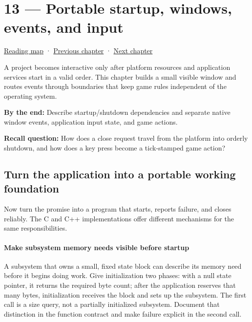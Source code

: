 \hypertarget{05-engine-i-ch013}{}
\chapter{13 --- Portable startup, windows, events, and input}\label{05-engine-i-ch013-portable-startup-windows-events-and-input}

\hyperref[volume-reading-map]{Reading map} · \hyperref[05-engine-i-ch012]{Previous chapter} · \hyperref[05-engine-i-ch014]{Next chapter}

A project becomes interactive only after platform resources and application services start in a valid order. This chapter builds a small visible window and routes events through boundaries that keep game rules independent of the operating system.

\textbf{By the end:} Describe startup/shutdown dependencies and separate native window events, application input state, and game actions.

\textbf{Recall question:} How does a close request travel from the platform into orderly shutdown, and how does a key press become a tick-stamped game action?

\section{Turn the application into a portable working foundation}\label{05-engine-i-ch013-turn-the-application-into-a-portable-working-foundation}

Now turn the promise into a program that starts, reports failure, and closes reliably. The C and C++ implementations offer different mechanisms for the same responsibilities.

\subsubsection{Make subsystem memory needs visible before startup}\label{05-engine-i-ch013-make-subsystem-memory-needs-visible-before-startup}

A subsystem that owns a small, fixed state block can describe its memory need before it begins doing work. Give initialization two phases: with a null state pointer, it returns the required byte count; after the application reserves that many bytes, initialization receives the block and sets up the subsystem. The first call is a size query, not a partially initialized subsystem. Document that distinction in the function contract and make failure explicit in the second call.

